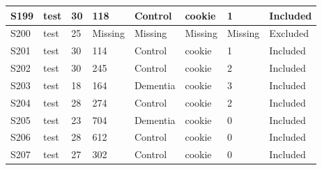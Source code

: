 \begin{center}
\begin{longtable}{|l|l|l|l|l|l|l|l|}
S199           & test                  & 30              & 118     & Control        & cookie          & 1            & Included      \\ \hline
S200           & test                  & 25              & Missing & Missing        & Missing         & Missing      & Excluded      \\ \hline
S201           & test                  & 30              & 114     & Control        & cookie          & 1            & Included      \\ \hline
S202           & test                  & 30              & 245     & Control        & cookie          & 2            & Included      \\ \hline
S203           & test                  & 18              & 164     & Dementia       & cookie          & 3            & Included      \\ \hline
S204           & test                  & 28              & 274     & Control        & cookie          & 2            & Included      \\ \hline
S205           & test                  & 23              & 704     & Dementia       & cookie          & 0            & Included      \\ \hline
S206           & test                  & 28              & 612     & Control        & cookie          & 0            & Included      \\ \hline
S207           & test                  & 27              & 302     & Control        & cookie          & 0            & Included      \\ \hline
\end{longtable}
\normalsize
\end{center}
